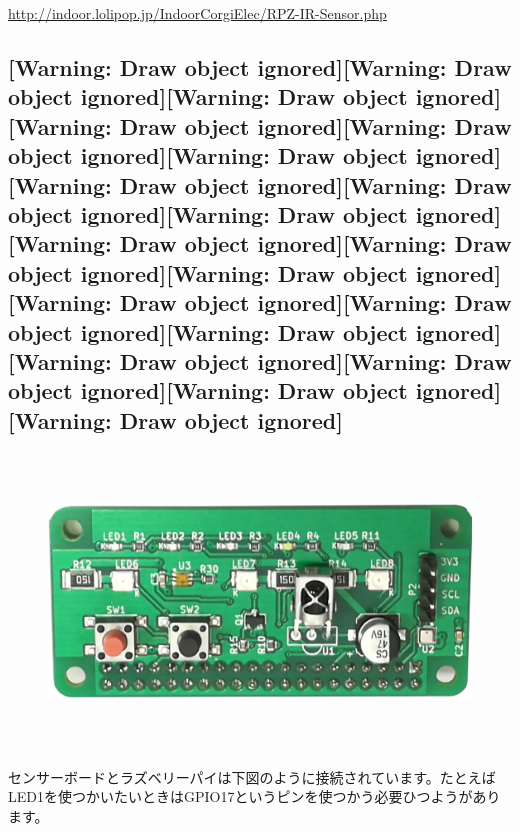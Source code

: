 \documentclass[a4paper,dvipdfmx]{jarticle}
\begin{document}
\url{http://indoor.lolipop.jp/IndoorCorgiElec/RPZ-IR-Sensor.php}


\bigskip

\subsection[]{[Warning: Draw object ignored][Warning: Draw object ignored][Warning: Draw object ignored][Warning: Draw
object ignored][Warning: Draw object ignored][Warning: Draw object ignored][Warning: Draw object ignored][Warning: Draw
object ignored][Warning: Draw object ignored][Warning: Draw object ignored][Warning: Draw object ignored][Warning: Draw
object ignored][Warning: Draw object ignored][Warning: Draw object ignored][Warning: Draw object ignored][Warning: Draw
object ignored][Warning: Draw object ignored][Warning: Draw object ignored][Warning: Draw object ignored]}
\begin{figure}
\centering
\includegraphics[width=17.006cm,height=7.849cm]{text03-img/text03-img030.png}
\end{figure}
\clearpage
センサーボードとラズベリーパイは下図のように接続されています。たとえばLED1を使つかいたいときはGPIO17というピンを使つかう必要ひつようがあります。
\end{document}
